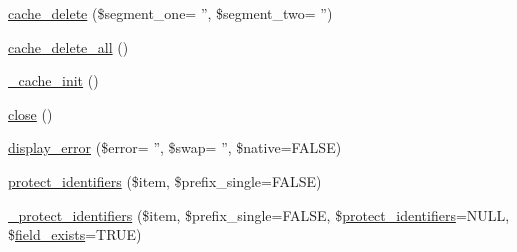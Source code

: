 \begin{DoxyCompactItemize}
\hyperlink{class_c_i___d_b__driver_a0f0619e794ea34b9f763a49c032c8078}{cache\-\_\-delete} (\$segment\-\_\-one= '', \$segment\-\_\-two= '')
\item 
\hyperlink{class_c_i___d_b__driver_a6e74f4d3938c78892f490b4f11faf318}{cache\-\_\-delete\-\_\-all} ()
\item 
\hyperlink{class_c_i___d_b__driver_a3991c9b589034f12f6fed26d83ac47e4}{\-\_\-cache\-\_\-init} ()
\item 
\hyperlink{class_c_i___d_b__driver_aa69c8bf1f1dcf4e72552efff1fe3e87e}{close} ()
\item 
\hyperlink{class_c_i___d_b__driver_a3ed7f13afef7c8883ad5a025416a19e4}{display\-\_\-error} (\$error= '', \$swap= '', \$native=F\-A\-L\-S\-E)
\item 
\hyperlink{class_c_i___d_b__driver_ad62af4b7440531bfc0c2784fc29ee53f}{protect\-\_\-identifiers} (\$item, \$prefix\-\_\-single=F\-A\-L\-S\-E)
\item 
\hyperlink{class_c_i___d_b__driver_abf89408eb9f64425b139f0d846412f22}{\-\_\-protect\-\_\-identifiers} (\$item, \$prefix\-\_\-single=F\-A\-L\-S\-E, \$\hyperlink{class_c_i___d_b__driver_ad62af4b7440531bfc0c2784fc29ee53f}{protect\-\_\-identifiers}=N\-U\-L\-L, \$\hyperlink{class_c_i___d_b__driver_ad349ffee1eed59a2eb8f0f1d3033764f}{field\-\_\-exists}=T\-R\-U\-E)
\end{DoxyCompactItemize}
